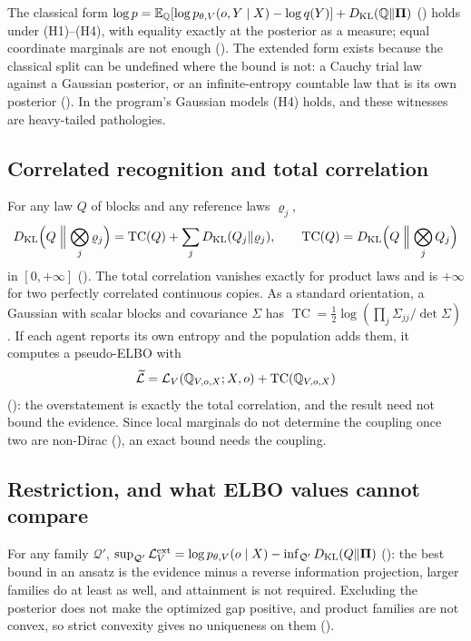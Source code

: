 The classical form $\log p=\mathbb E_{\mathbb Q}[\log p_{\theta,V}(o,Y\mid X)-\log q(Y)]+D_{\mathrm{KL}}(\mathbb Q\Vert\boldsymbol\Pi)$
() holds under (H1)--(H4), with equality exactly at the posterior as a measure;
equal coordinate marginals are not enough (). The extended form exists because
the classical split can be undefined where the bound is not: a Cauchy trial law against a Gaussian
posterior, or an infinite-entropy countable law that is its own posterior
(). In the program's Gaussian models (H4) holds, and these witnesses
are heavy-tailed pathologies.

\subsection{Correlated recognition and total correlation}
\label{comp:ch05-tc}

For any law $Q$ of blocks and any reference laws $\varrho_j$,
\[
D_{\mathrm{KL}}\Bigl(Q\Bigm\Vert\bigotimes_j\varrho_j\Bigr)=\operatorname{TC}(Q)+\sum_jD_{\mathrm{KL}}(Q_j\Vert\varrho_j),
\qquad
\operatorname{TC}(Q)=D_{\mathrm{KL}}\Bigl(Q\Bigm\Vert\bigotimes_jQ_j\Bigr)
\]
in $[0,+\infty]$ (). The total correlation vanishes exactly for
product laws and is $+\infty$ for two perfectly correlated continuous copies. As a standard orientation, a
Gaussian with scalar blocks and covariance $\Sigma$ has $\operatorname{TC}=\tfrac12\log(\prod_j\Sigma_{jj}/\det\Sigma)$.
If each agent reports its own entropy and the population adds them, it computes a pseudo-ELBO with
\[
\widetilde{\mathcal L}=\mathcal L_V(\mathbb Q_{V,o,X};X,o)+\operatorname{TC}(\mathbb Q_{V,o,X})
\]
(): the overstatement is exactly the total correlation, and the result
need not bound the evidence. Since local marginals do not determine the coupling once two are non-Dirac
(), an exact bound needs the coupling.

\subsection{Restriction, and what ELBO values cannot compare}
\label{comp:ch05-restriction}

For any family $\mathcal Q'$,
$\sup_{\mathcal Q'}\mathcal L_V^{\mathrm{ext}}=\log p_{\theta,V}(o\mid X)-\inf_{\mathcal Q'}D_{\mathrm{KL}}(Q\Vert\boldsymbol\Pi)$
(): the best bound in an ansatz is the evidence minus a reverse information
projection, larger families do at least as well, and attainment is not required. Excluding the posterior
does not make the optimized gap positive, and product families are not convex, so strict convexity gives no
uniqueness on them ().

